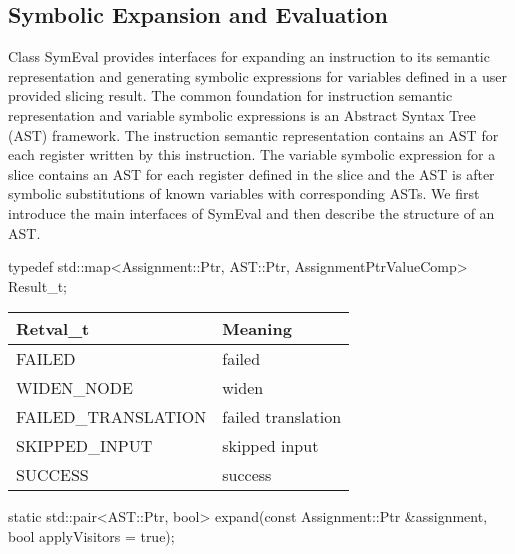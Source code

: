 \subsection{Symbolic Expansion and Evaluation}
\label{sec:symeval}


Class SymEval provides interfaces for expanding an instruction to its semantic
representation and generating symbolic expressions for variables defined in a
user provided slicing result. The common foundation for instruction semantic
representation and variable symbolic expressions is an Abstract Syntax Tree
(AST) framework. The instruction semantic representation contains an AST for
each register written by this instruction. The variable symbolic expression for
a slice contains an AST for each register defined in the slice and the AST is
after symbolic substitutions of known variables with corresponding ASTs. We
first introduce the main interfaces of SymEval and then describe the structure
of an AST.

\begin{apient}
typedef std::map<Assignment::Ptr, AST::Ptr, AssignmentPtrValueComp> Result_t;
\end{apient}

\begin{center}
\begin{tabular}{ll}
\toprule
Retval\_t & Meaning \\
\midrule
FAILED &  failed \\
WIDEN\_NODE & widen \\
FAILED\_TRANSLATION & failed translation \\
SKIPPED\_INPUT & skipped input \\
SUCCESS & success \\
\bottomrule
\end{tabular}
\end{center}

\begin{apient}
static std::pair<AST::Ptr, bool> expand(const Assignment::Ptr &assignment, 
                                        bool applyVisitors = true);
\end{apient}


